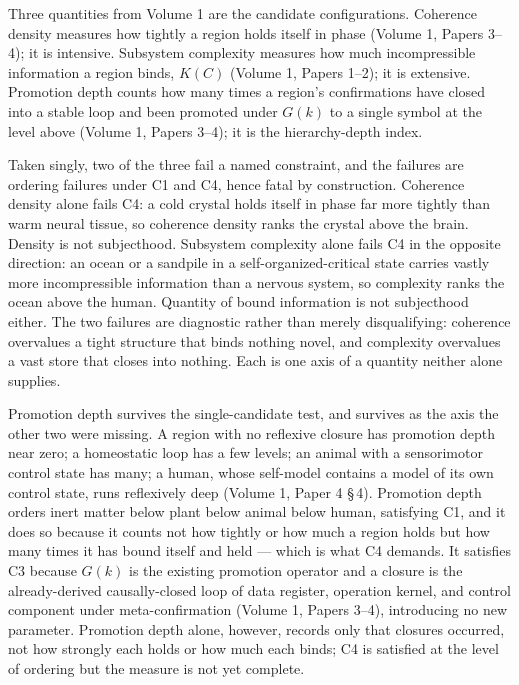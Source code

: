 \documentclass[11pt,oneside]{report}
\theoremstyle{definition}
\theoremstyle{remark}
\begin{document}
Three quantities from Volume 1 are the candidate configurations.
Coherence density measures how tightly a region holds itself in phase
(Volume 1, Papers 3--4); it is intensive. Subsystem complexity measures
how much incompressible information a region binds, \ensuremath{K(C)}
(Volume 1, Papers 1--2); it is extensive. Promotion depth counts how many
times a region's confirmations have closed into a stable loop and been
promoted under \ensuremath{G(k)} to a single symbol at the level above
(Volume 1, Papers 3--4); it is the hierarchy-depth index.

Taken singly, two of the three fail a named constraint, and the failures
are ordering failures under C1 and C4, hence fatal by construction.
Coherence density alone fails C4: a cold crystal holds itself in phase
far more tightly than warm neural tissue, so coherence density ranks the
crystal above the brain. Density is not subjecthood. Subsystem complexity
alone fails C4 in the opposite direction: an ocean or a sandpile in a
self-organized-critical state carries vastly more incompressible
information than a nervous system, so complexity ranks the ocean above
the human. Quantity of bound information is not subjecthood either. The
two failures are diagnostic rather than merely disqualifying: coherence
overvalues a tight structure that binds nothing novel, and complexity
overvalues a vast store that closes into nothing. Each is one axis of a
quantity neither alone supplies.

Promotion depth survives the single-candidate test, and survives as the
axis the other two were missing. A region with no reflexive closure has
promotion depth near zero; a homeostatic loop has a few levels; an animal
with a sensorimotor control state has many; a human, whose self-model
contains a model of its own control state, runs reflexively deep (Volume
1, Paper 4 \S\,4). Promotion depth orders inert matter below plant below
animal below human, satisfying C1, and it does so because it counts not
how tightly or how much a region holds but how many times it has bound
itself and held --- which is what C4 demands. It satisfies C3 because
\ensuremath{G(k)} is the existing promotion operator and a closure is the
already-derived causally-closed loop of data register, operation kernel,
and control component under meta-confirmation (Volume 1, Papers 3--4),
introducing no new parameter. Promotion depth alone, however, records
only that closures occurred, not how strongly each holds or how much each
binds; C4 is satisfied at the level of ordering but the measure is not
yet complete.
\end{document}
